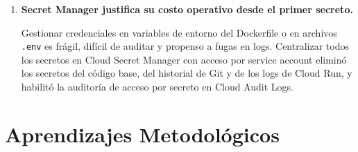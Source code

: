 \begin{enumerate}
    \textit{Principio derivado:} para tareas de larga duración, el patrón
    \textit{fire-and-poll} debe ser la primera opción de diseño, no la última.

    \item \textbf{Secret Manager justifica su costo operativo desde el primer secreto.}

    Gestionar credenciales en variables de entorno del Dockerfile o en
    archivos \texttt{.env} es frágil, difícil de auditar y propenso a
    fugas en logs. Centralizar todos los secretos en Cloud Secret Manager
    con acceso por service account eliminó los secretos del código base,
    del historial de Git y de los logs de Cloud Run, y habilitó la
    auditoría de acceso por secreto en Cloud Audit Logs.

\end{enumerate}

\section*{Aprendizajes Metodológicos}

